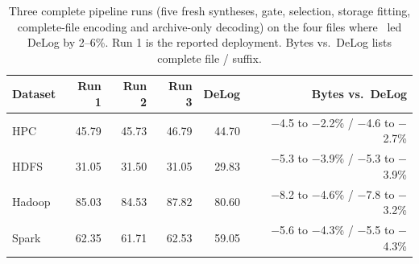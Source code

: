 \begin{table}[t]\centering\small
\caption{Three complete pipeline runs (five fresh syntheses, gate, selection, storage fitting, complete-file encoding and archive-only decoding) on the four files where \tool\ led DeLog by 2--6\%. Run 1 is the reported deployment. Bytes vs.\ DeLog lists complete file / suffix.}
\label{tab:repeats}
\setlength{\tabcolsep}{4pt}
\begin{tabular}{lrrrrr}
\toprule
Dataset & Run 1 & Run 2 & Run 3 & DeLog & Bytes vs.\ DeLog \\
\midrule
HPC & 45.79 & 45.73 & 46.79 & 44.70 & $-$4.5 to $-$2.2\% / $-$4.6 to $-$2.7\% \\
HDFS & 31.05 & 31.50 & 31.05 & 29.83 & $-$5.3 to $-$3.9\% / $-$5.3 to $-$3.9\% \\
Hadoop & 85.03 & 84.53 & 87.82 & 80.60 & $-$8.2 to $-$4.6\% / $-$7.8 to $-$3.2\% \\
Spark & 62.35 & 61.71 & 62.53 & 59.05 & $-$5.6 to $-$4.3\% / $-$5.5 to $-$4.3\% \\
\bottomrule
\end{tabular}\end{table}
